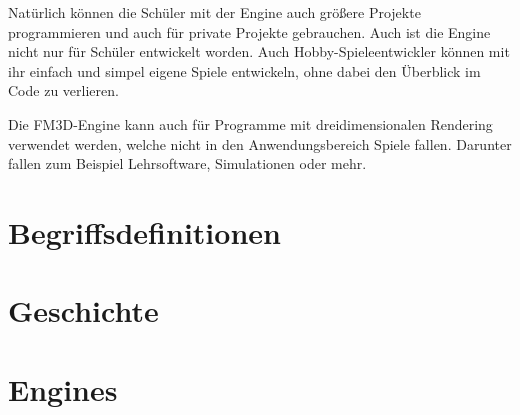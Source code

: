 Natürlich können die Schüler mit der Engine auch größere Projekte programmieren und auch für private Projekte gebrauchen. Auch ist die Engine nicht nur für Schüler entwickelt worden. Auch Hobby-Spieleentwickler können mit ihr einfach und simpel eigene Spiele entwickeln, ohne dabei den Überblick im Code zu verlieren.

Die FM3D-Engine kann auch für Programme mit dreidimensionalen Rendering verwendet werden, welche nicht in den Anwendungsbereich Spiele fallen. Darunter fallen zum Beispiel Lehrsoftware, Simulationen oder mehr.

\section{Begriffsdefinitionen}




\section{Geschichte}



\section{Engines}
\label{engines}


